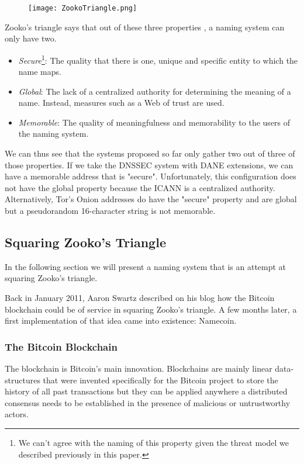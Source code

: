 \documentclass{vldb}
\begin{document}
\begin{figure}[h!]
\centering
\texttt{[image: ZookoTriangle.png]}
\end{figure}

Zooko's triangle says that out of these three properties \cite{zookoTriangleWikipedia}, a naming system can only have two.
\begin{itemize}
\item \emph{Secure}\footnote{We can't agree with the naming of this property given the threat model we described previously in this paper.}: The quality that there is one, unique and specific entity to which the name maps.
\item \emph{Global}: The lack of a centralized authority for determining the meaning of a name. Instead, measures such as a Web of trust are used.
\item \emph{Memorable}: The quality of meaningfulness and memorability to the users of the naming system.
\end{itemize}

We can thus see that the systems proposed so far only gather two out of three of those properties. If we take the DNSSEC system with DANE extensions, we can have a memorable address that is "secure". Unfortunately, this configuration does not have the global property because the ICANN is a centralized authority. Alternatively, Tor's Onion addresses do have the "secure" property and are global but a pseudorandom 16-character string is not memorable.

\subsection{Squaring Zooko's Triangle}

In the following section we will present a naming system that is an attempt at squaring Zooko's triangle.

Back in January 2011, Aaron Swartz described on his blog\cite{aaronBlog} how the Bitcoin blockchain could be of service in squaring Zooko's triangle. A few months later, a first implementation of that idea came into existence: Namecoin.

\subsubsection{The Bitcoin Blockchain}

The blockchain is Bitcoin's main innovation. Blockchains are mainly linear data-structures that were invented specifically for the Bitcoin project to store the history of all past transactions but they can be applied anywhere a distributed consensus needs to be established in the presence of malicious or untrustworthy actors.
\end{document}
